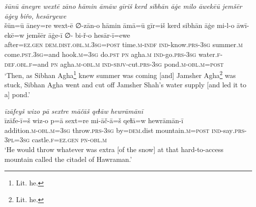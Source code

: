 \ea \label{DP.30}
\textit{šūnū āneyre wextē zāno hāmin āmāw gīriš kerd sibhān āġe milo āwekēū jemšēr āġey biřo, hesāryewe} \\ 
\gll šūn=ū āney=re wext-ē ∅-zān-o hāmin āmā=ū gīr=iš kerd sibhān āġe mi-l-o āwī-ekē=w jemšēr āġe-ī ∅- bi-ř-o hesār-ī=ewe \\ 
 after\textsc{=ez}\textsc{.gen} \textsc{dem.dist}\textsc{.obl}\textsc{.m}\textsc{.3sg}\textsc{=\textsc{post}} time\textsc{.m}\textsc{-indf} \textsc{ind-}know\textsc{.prs}\textsc{-3sg} summer\textsc{.m} come\textsc{.pst}\textsc{.3sg}=and hook\textsc{.m}\textsc{=3sg} do\textsc{.pst} \textsc{pn} agha\textsc{.m} \textsc{ind-}go\textsc{.prs}\textsc{-3sg} water\textsc{\textsc{.f}}\textsc{-def}\textsc{.obl}\textsc{\textsc{.f}}=and \textsc{pn} agha\textsc{.m}\textsc{-obl}\textsc{.m} \textsc{ind-}\textsc{sbjv-}cut\textsc{.prs}\textsc{-3sg} pond\textsc{.m}\textsc{-obl}\textsc{.m}\textsc{=\textsc{post}} \\ 
\glt `Then, as Sibhan Agha\footnote{Lit. he.} knew summer was coming [and] Jamsher Agha\footnote{Lit. he.} was stuck, Sibhan Agha went and cut off Jamsher Shah’s water supply [and led it to a] pond.'
\z 
 
\ea \label{DP.35}
\textit{īzāfeyš wizo pā sextre māčāš qeɫāw hewrāmānī} \\ 
\gll īzāfe-ī=š wiz-o p=ā sext=re mi-āč-ā=š qeɫā=w hewrāmān-ī \\ 
 addition\textsc{.m}\textsc{-obl}\textsc{.m}\textsc{=3sg} throw\textsc{.prs}\textsc{-3sg} by\textsc{=dem}.dist mountain\textsc{.m}\textsc{=\textsc{post}} \textsc{ind-}say\textsc{.prs}\textsc{-3pl}\textsc{=3sg} castle\textsc{\textsc{.f}}\textsc{=ez}\textsc{.gen} \textsc{pn}\textsc{-obl}\textsc{.m} \\ 
\glt `He would throw whatever was extra [of the snow] at that hard-to-access mountain called the citadel of Hawraman.'
\z 
 
